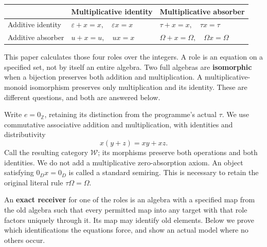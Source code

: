 \documentclass[
]{article}
\newcounter{none} %
\begin{document}
{\def\LTcaptype{none} %
\begin{longtable}[]{@{}
  >{\raggedright\arraybackslash}p{}
  >{\raggedright\arraybackslash}p{}
  >{\raggedright\arraybackslash}p{}@{}}
\toprule\noalign{}
\begin{minipage}[b]{\linewidth}\raggedright
\end{minipage} & \begin{minipage}[b]{\linewidth}\raggedright
Multiplicative identity
\end{minipage} & \begin{minipage}[b]{\linewidth}\raggedright
Multiplicative absorber
\end{minipage} \\
\midrule\noalign{}
\endhead
\bottomrule\noalign{}
\endlastfoot
Additive identity & \(\varepsilon+x=x,\quad\varepsilon x=x\) &
\(\tau+x=x,\quad\tau x=\tau\) \\
Additive absorber & \(u+x=u,\quad ux=x\) &
\(\Omega+x=\Omega,\quad\Omega x=\Omega\) \\
\end{longtable}
}

This paper calculates those four roles over the integers. A role is an
equation on a specified set, not by itself an entire algebra. Two full
algebras are \textbf{isomorphic} when a bijection preserves both
addition and multiplication. A multiplicative-monoid isomorphism
preserves only multiplication and its identity. These are different
questions, and both are answered below.

Write \(e=0_{\mathbb Z}\), retaining its distinction from the
programme's actual \(\tau\). We use commutative associative addition and
multiplication, with identities and distributivity \[
x(y+z)=xy+xz.
\] Call the resulting category \(\mathcal W\); its morphisms preserve
both operations and both identities. We do not add a multiplicative
zero-absorption axiom. An object satisfying \(0_Dx=0_D\) is called a
standard semiring. This is necessary to retain the original literal rule
\(\tau\Omega=\Omega\).

An \textbf{exact receiver} for one of the roles is an algebra with a
specified map from the old algebra such that every permitted map into
any target with that role factors uniquely through it. Its map may
identify old elements. Below we prove which identifications the
equations force, and show an actual model where no others occur.
\end{document}
